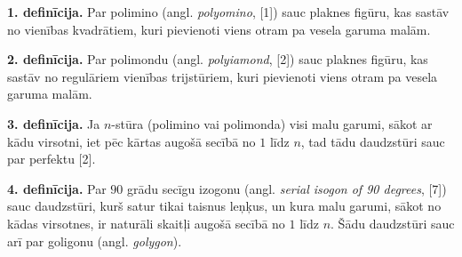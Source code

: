\documentclass[utf8]{ludis2022}
\begin{document}
{\bf{1. definīcija.}}
Par polimino (angl. {\em polyomino}, [1]) sauc plaknes figūru, kas sastāv no vienības kvadrātiem, kuri pievienoti 
viens otram pa vesela garuma malām.


\vspace{10pt}

\noindent
{\bf{2. definīcija.}}
Par polimondu (angl. {\em polyiamond}, [2]) sauc plaknes figūru, kas sastāv no regulāriem vienības trijstūriem, 
kuri pievienoti viens otram pa vesela garuma malām.




\vspace{10pt}

\noindent
{\bf{3. definīcija.}}
    Ja $n$-stūra (polimino vai polimonda) visi malu garumi, sākot ar kādu virsotni, iet 
pēc kārtas augošā secībā no $1$ līdz $n$, tad tādu daudzstūri sauc par perfektu [2].




\vspace{10pt}

\noindent
{\bf{4. definīcija.}}
Par $90$ grādu secīgu
izogonu (angl. {\em serial isogon of 90 degrees}, [7]) sauc daudzstūri, kurš satur tikai taisnus leņķus, un kura malu garumi, sākot no kādas virsotnes, ir naturāli skaitļi augošā secībā no $1$ līdz $n$. Šādu daudzstūri sauc arī par goligonu (angl. {\em golygon}).


\end{document}
